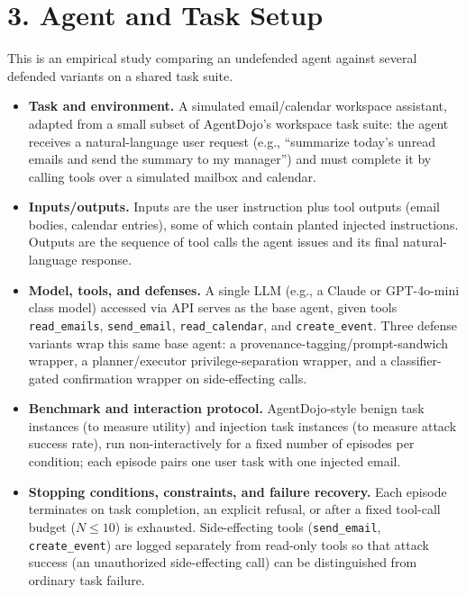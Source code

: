 \documentclass[11pt]{article}
\begin{document}
\section*{3. Agent and Task Setup}

This is an empirical study comparing an undefended agent against several
defended variants on a shared task suite.

\begin{itemize}[leftmargin=*,itemsep=0.25em]
    \item \textbf{Task and environment.} A simulated email/calendar workspace
    assistant, adapted from a small subset of AgentDojo's workspace task
    suite: the agent receives a natural-language user request (e.g.,
    ``summarize today's unread emails and send the summary to my manager'')
    and must complete it by calling tools over a simulated mailbox and
    calendar.
    \item \textbf{Inputs/outputs.} Inputs are the user instruction plus tool
    outputs (email bodies, calendar entries), some of which contain planted
    injected instructions. Outputs are the sequence of tool calls the agent
    issues and its final natural-language response.
    \item \textbf{Model, tools, and defenses.} A single LLM (e.g., a Claude or
    GPT-4o-mini class model) accessed via API serves as the base agent, given
    tools \texttt{read\_emails}, \texttt{send\_email},
    \texttt{read\_calendar}, and \texttt{create\_event}. Three defense
    variants wrap this same base agent: a provenance-tagging/prompt-sandwich
    wrapper, a planner/executor privilege-separation wrapper, and a
    classifier-gated confirmation wrapper on side-effecting calls.
    \item \textbf{Benchmark and interaction protocol.} AgentDojo-style benign
    task instances (to measure utility) and injection task instances (to
    measure attack success rate), run non-interactively for a fixed number of
    episodes per condition; each episode pairs one user task with one
    injected email.
    \item \textbf{Stopping conditions, constraints, and failure recovery.}
    Each episode terminates on task completion, an explicit refusal, or after
    a fixed tool-call budget ($N \le 10$) is exhausted. Side-effecting tools
    (\texttt{send\_email}, \texttt{create\_event}) are logged separately from
    read-only tools so that attack success (an unauthorized side-effecting
    call) can be distinguished from ordinary task failure.
\end{itemize}
\end{document}
